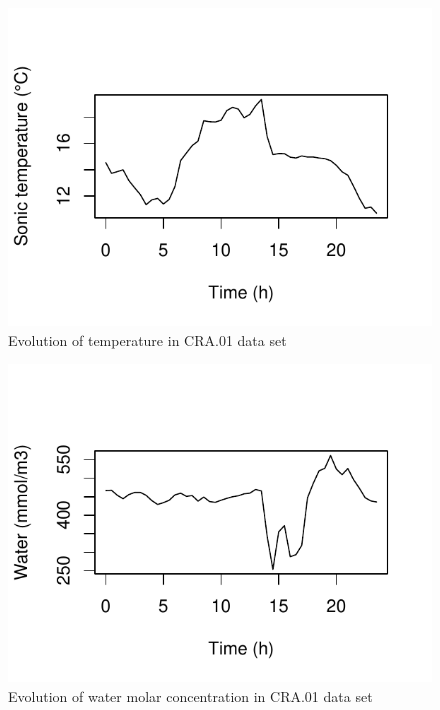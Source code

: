 \documentclass[a4paper,10pt]{book}
\begin{document}
\begin{figure}[htp]
 \centering
 \begin{center}
 \includegraphics[scale=1.1,keepaspectratio=true]{./diagrams/CRA01_Temp.pdf}
 \end{center}
 \caption{Evolution of temperature in CRA.01 data set}
 \label{fig:CRA.01 Temp}
\end{figure}

\begin{figure}[htp]
 \centering
 \begin{center}
 \includegraphics[scale=1.1,keepaspectratio=true]{./diagrams/CRA01_Q.pdf}
 \end{center}
 \caption{Evolution of water molar concentration in CRA.01 data set}
 \label{fig:CRA.01 Q}
\end{figure}
\end{document}

